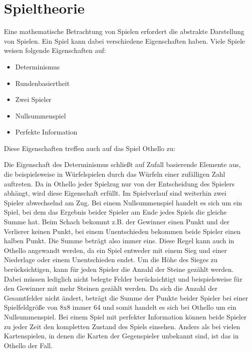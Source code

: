 \section{Spieltheorie}

Eine mathematische Betrachtung von Spielen erfordert die abstrakte Darstellung von Spielen.
Ein Spiel kann dabei verschiedene Eigenschaften haben. Viele Spiele weisen folgende Eigenschaften auf:

\begin{itemize}
    \item Determinismus
    \item Rundenbasiertheit
    \item Zwei Spieler
    \item Nullsummenspiel
    \item Perfekte Information
\end{itemize}

Diese Eigenschaften treffen auch auf das Spiel Othello zu:

Die Eigenschaft des Determinismus schließt auf Zufall basierende Elemente aus, die beispielsweise in Würfelspielen durch das Würfeln einer zufälligen Zahl auftreten.
Da in Othello jeder Spielzug nur von der Entscheidung des Spielers abhängt, wird diese Eigenschaft erfüllt.
Im Spielverlauf sind weiterhin zwei Spieler abwechselnd am Zug.
Bei einem Nullsummenspiel handelt es sich um ein Spiel, bei dem das Ergebnis beider Spieler am Ende jedes Spiels die gleiche Summe hat.
Beim Schach bekommt z.B. der Gewinner einen Punkt und der Verlierer keinen Punkt, bei einem Unentschieden bekommen beide Spieler einen halben Punkt.
Die Summe beträgt also immer eins.
Diese Regel kann auch in Othello angewandt werden, da ein Spiel entweder mit einem Sieg und einer Niederlage oder einem Unentschieden endet.
Um die Höhe des Sieges zu berücksichtigen, kann für jeden Spieler die Anzahl der Steine gezählt werden.
Dabei müssen lediglich nicht belegte Felder berücksichtigt und beispielsweise für den Gewinner mit mehr Steinen gezählt werden.
Da sich die Anzahl der Gesamtfelder nicht ändert, beträgt die Summe der Punkte beider Spieler bei einer Spielfeldgröße von 8x8 immer 64 und somit handelt es sich bei Othello um ein Nullsummenspiel.
Bei einem Spiel mit perfekter Information können beide Spieler zu jeder Zeit den kompletten Zustand des Spiels einsehen.
Anders als bei vielen Kartenspielen, in denen die Karten der Gegenspieler unbekannt sind, ist das in Othello der Fall.
\cite[S.~161f.]{ai2010russel}

